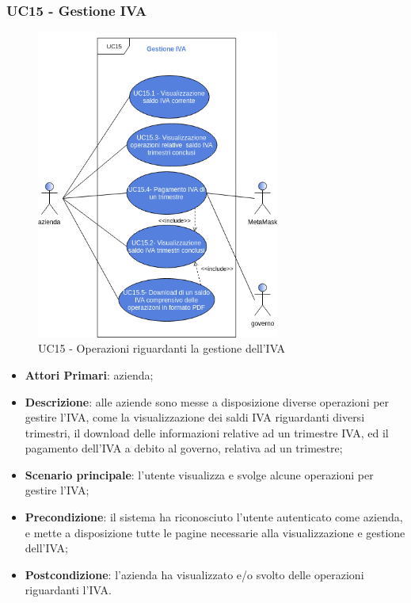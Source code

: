 \subsubsection{UC15 - Gestione IVA}
\begin{figure}[H]
	\includegraphics[width=8cm]{res/images/UC15-Generale.png}
	\centering
	\caption{UC15 - Operazioni riguardanti la gestione dell'IVA}
\end{figure}
\begin{itemize}
	\item \textbf{Attori Primari}: azienda;
	\item \textbf{Descrizione}: alle aziende sono messe a disposizione diverse operazioni per gestire l'IVA, come la visualizzazione dei saldi IVA riguardanti diversi trimestri, il download delle informazioni relative ad un trimestre IVA, ed il pagamento dell'IVA a debito al governo\glo, relativa ad un trimestre;
	\item \textbf{Scenario principale}: l'utente visualizza e svolge alcune operazioni per gestire l'IVA;
	\item \textbf{Precondizione}: il sistema ha riconosciuto l'utente autenticato come azienda, e mette a disposizione tutte le pagine necessarie alla visualizzazione e gestione dell'IVA;
	\item \textbf{Postcondizione}: l'azienda ha visualizzato e/o svolto delle operazioni riguardanti l'IVA.
\end{itemize} 
